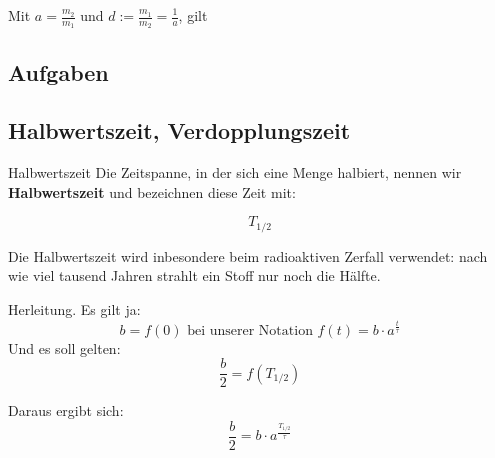 Mit $a = \frac{m_2}{m_1}$ und $d := \frac{m_1}{m_2} = \frac{1}{a}$, gilt

\begin{center}
\end{center}


\newpage



\newpage



\subsection*{Aufgaben}
\newpage

\subsection{Halbwertszeit, Verdopplungszeit}

\begin{definition}{Halbwertszeit}{}
Die Zeitspanne, in der sich eine Menge halbiert, nennen wir
\textbf{Halbwertszeit} und bezeichnen diese Zeit mit:

$$T_{1/2}$$
\end{definition}

Die Halbwertszeit wird inbesondere
  beim radioaktiven Zerfall verwendet: nach wie viel tausend Jahren strahlt
  ein Stoff nur noch die Hälfte.

  Herleitung. Es gilt ja:
  $$b=f(0) \textrm{ bei unserer Notation } f(t) = b\cdot{}a^\frac{t}\tau$$
  Und es soll gelten:
  $$\frac{b}2 = f(T_{1/2})$$

  Daraus ergibt sich:
  $$\frac{b}2 = b\cdot{}a^{\frac{T_{1/2}}{\tau}}$$

